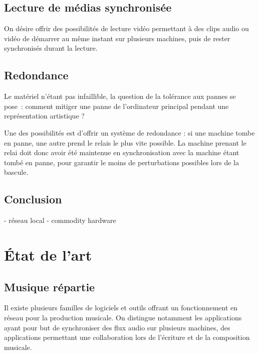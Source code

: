 \documentclass{article}
\newcommand\trigger{point d'interaction\xspace}
\begin{document}

\subsection{Lecture de médias synchronisée}
On désire offrir des possibilités de lecture vidéo permettant à 
des clips audio ou vidéo de démarrer au même instant sur plusieurs machines, 
puis de rester synchronisés durant la lecture.

\subsection{Redondance}
Le matériel n'étant pas infaillible, la question de la tolérance aux pannes se pose~: comment mitiger une panne de l'ordinateur principal pendant une représentation artistique ?

Une des possibilités est d'offrir un système de redondance : si une machine tombe en panne, une autre prend le relais le plus vite possible.
La machine prenant le relai doit donc avoir été maintenue en synchronisation avec la machine étant tombé en panne, pour garantir le moins de perturbations possibles lors de la bascule.
 

\subsection{Conclusion}
- réseau local
- commodity hardware

\section{État de l'art}
\subsection{Musique répartie}
Il existe plusieurs familles de logiciels et outils offrant un fonctionnement en réseau pour la production musicale.
On distingue notamment les applications ayant pour but de synchroniser des 
flux audio sur plusieurs machines, des applications permettant une collaboration lors 
de l'écriture et de la composition musicale.
\end{document}

